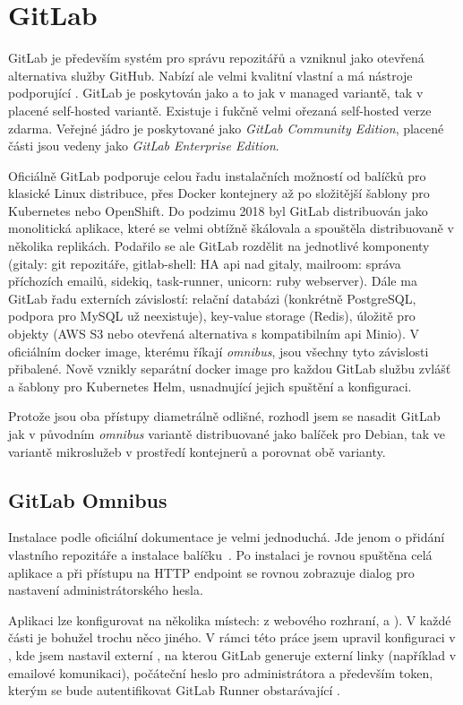 \section{GitLab}
    GitLab je především systém pro správu repozitářů a vzniknul jako otevřená alternativa služby GitHub. Nabízí ale velmi kvalitní vlastní \CI a má nástroje podporující \CD. GitLab je poskytován jako  a to jak v managed variantě, tak v placené self-hosted variantě. Existuje i fukčně velmi ořezaná self-hosted verze zdarma. Veřejné jádro je poskytované jako \textit{GitLab Community Edition}, placené části jsou vedeny jako \textit{GitLab Enterprise Edition}.

    Oficiálně GitLab podporuje celou řadu instalačních možností od balíčků pro klasické Linux distribuce, přes Docker kontejnery až po složitější šablony pro Kubernetes nebo OpenShift. Do podzimu 2018 byl GitLab distribuován jako monolitická aplikace, které se velmi obtížně škálovala a spouštěla distribuovaně v několika replikách. Podařilo se ale GitLab rozdělit na jednotlivé komponenty (gitaly: git repozitáře, gitlab-shell: HA api nad gitaly, mailroom: správa příchozích emailů, sidekiq, task-runner, unicorn: ruby webserver). Dále ma GitLab řadu externích závislostí: relační databázi (konkrétně PostgreSQL, podpora pro MySQL už neexistuje), key-value storage (Redis), úložitě pro objekty (AWS S3 nebo otevřená alternativa s kompatibilním api Minio). V oficiálním docker image, kterému říkají \textit{omnibus}, jsou všechny tyto závislosti přibalené. Nově vznikly separátní docker image pro každou GitLab službu zvlášť a šablony pro Kubernetes Helm, usnadnující jejich spuštění a konfiguraci.

    Protože jsou oba přístupy diametrálně odlišné, rozhodl jsem se nasadit GitLab jak v původním \textit{omnibus} variantě distribuované jako balíček pro Debian, tak ve variantě mikroslužeb v prostředí kontejnerů a porovnat obě varianty.

    \subsection{GitLab Omnibus}
        Instalace podle oficiální dokumentace je velmi jednoduchá. Jde jenom o přidání vlastního repozitáře a instalace balíčku~\cite{gitlab-install-ubuntu}. Po instalaci je rovnou spuštěna celá aplikace a při přístupu na HTTP endpoint se rovnou zobrazuje dialog pro nastavení administrátorského hesla.

        Aplikaci lze konfigurovat na několika místech: z webového rozhraní,  a ). V každé části je bohužel trochu něco jiného. V rámci této práce jsem upravil konfiguraci v , kde jsem nastavil externí , na kterou GitLab generuje externí linky (například v emailové komunikaci), počáteční heslo pro administrátora a především token, kterým se bude autentifikovat GitLab Runner obstarávající \CI.

